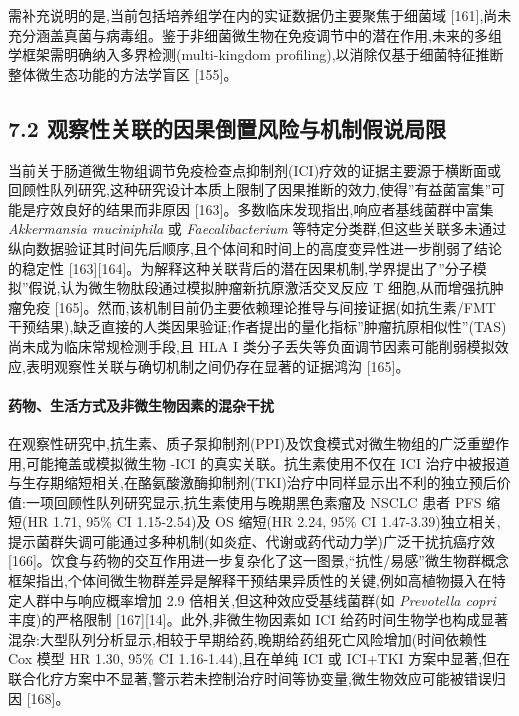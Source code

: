 需补充说明的是,当前包括培养组学在内的实证数据仍主要聚焦于细菌域 {[}161{]},尚未充分涵盖真菌与病毒组。鉴于非细菌微生物在免疫调节中的潜在作用,未来的多组学框架需明确纳入多界检测(multi-kingdom profiling),以消除仅基于细菌特征推断整体微生态功能的方法学盲区 {[}155{]}。

\subsection{7.2 观察性关联的因果倒置风险与机制假说局限}\label{ux89c2ux5bdfux6027ux5173ux8054ux7684ux56e0ux679cux5012ux7f6eux98ceux9669ux4e0eux673aux5236ux5047ux8bf4ux5c40ux9650}

当前关于肠道微生物组调节免疫检查点抑制剂(ICI)疗效的证据主要源于横断面或回顾性队列研究,这种研究设计本质上限制了因果推断的效力,使得''有益菌富集''可能是疗效良好的结果而非原因 {[}163{]}。多数临床发现指出,响应者基线菌群中富集 \emph{Akkermansia muciniphila} 或 \emph{Faecalibacterium} 等特定分类群,但这些关联多未通过纵向数据验证其时间先后顺序,且个体间和时间上的高度变异性进一步削弱了结论的稳定性 {[}163{]}{[}164{]}。为解释这种关联背后的潜在因果机制,学界提出了''分子模拟''假说,认为微生物肽段通过模拟肿瘤新抗原激活交叉反应 T 细胞,从而增强抗肿瘤免疫 {[}165{]}。然而,该机制目前仍主要依赖理论推导与间接证据(如抗生素/FMT 干预结果),缺乏直接的人类因果验证;作者提出的量化指标''肿瘤抗原相似性''(TAS)尚未成为临床常规检测手段,且 HLA I 类分子丢失等负面调节因素可能削弱模拟效应,表明观察性关联与确切机制之间仍存在显著的证据鸿沟 {[}165{]}。

\paragraph{药物、生活方式及非微生物因素的混杂干扰}\label{ux836fux7269ux751fux6d3bux65b9ux5f0fux53caux975eux5faeux751fux7269ux56e0ux7d20ux7684ux6df7ux6742ux5e72ux6270}

在观察性研究中,抗生素、质子泵抑制剂(PPI)及饮食模式对微生物组的广泛重塑作用,可能掩盖或模拟微生物 -ICI 的真实关联。抗生素使用不仅在 ICI 治疗中被报道与生存期缩短相关,在酪氨酸激酶抑制剂(TKI)治疗中同样显示出不利的独立预后价值:一项回顾性队列研究显示,抗生素使用与晚期黑色素瘤及 NSCLC 患者 PFS 缩短(HR 1.71, 95\% CI 1.15-2.54)及 OS 缩短(HR 2.24, 95\% CI 1.47-3.39)独立相关,提示菌群失调可能通过多种机制(如炎症、代谢或药代动力学)广泛干扰抗癌疗效 {[}166{]}。饮食与药物的交互作用进一步复杂化了这一图景,``抗性/易感''微生物群概念框架指出,个体间微生物群差异是解释干预结果异质性的关键,例如高植物摄入在特定人群中与响应概率增加 2.9 倍相关,但这种效应受基线菌群(如 \emph{Prevotella copri} 丰度)的严格限制 {[}167{]}{[}14{]}。此外,非微生物因素如 ICI 给药时间生物学也构成显著混杂:大型队列分析显示,相较于早期给药,晚期给药组死亡风险增加(时间依赖性 Cox 模型 HR 1.30, 95\% CI 1.16-1.44),且在单纯 ICI 或 ICI+TKI 方案中显著,但在联合化疗方案中不显著,警示若未控制治疗时间等协变量,微生物效应可能被错误归因 {[}168{]}。

